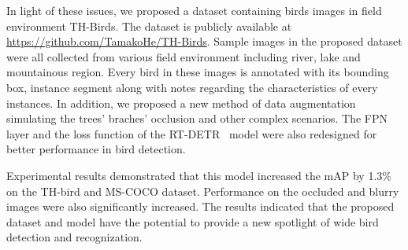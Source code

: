 In light of these issues, we proposed a dataset 
containing birds images in field environment TH-Birds. 
The dataset is publicly available at \href{https://github.com/TamakoHe/TH-Birds}{https://github.com/TamakoHe/TH-Birds}. 
Sample images in the proposed dataset were all collected from various field environment including river, lake and mountainous region. Every bird in these images is annotated with its bounding box, instance segment along with notes
regarding the characteristics of every instances.  In addition, we proposed 
a new method of data augmentation simulating the trees' braches' occlusion 
and other complex scenarios. The FPN layer and the loss function of the 
RT-DETR~\cite{RTDETR} model were also redesigned for better performance in bird detection. 

Experimental results demonstrated that this model increased the mAP by 
1.3\% on the TH-bird and MS-COCO dataset. Performance on the occluded 
and blurry images were also significantly increased. The results indicated 
that the proposed dataset and model have the potential to provide a new spotlight
of wide bird detection and recognization. 
